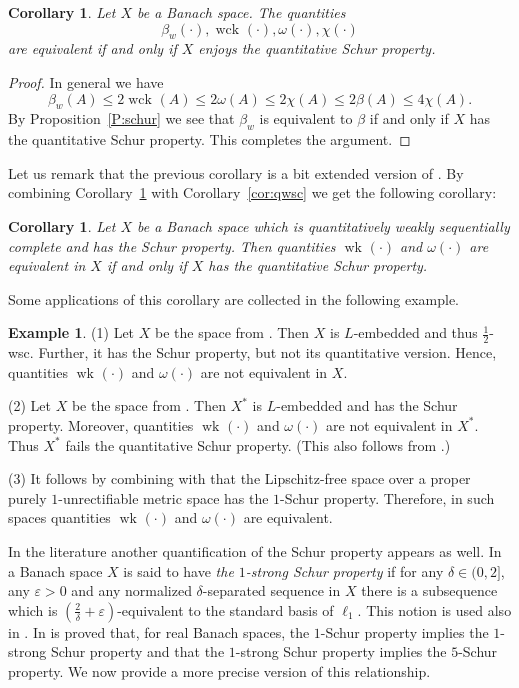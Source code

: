 \documentclass{amsart}
\numberwithin{equation}{section}
\newtheorem{cor}[thm]{Corollary}
\theoremstyle{definition}
\newtheorem{example2}[thm]{Example}
\newcommand{\wk}[2][]{\operatorname{wk}_{#1}\left(#2\right)}
\newcommand{\wck}[2][]{\operatorname{wck}_{#1}\left(#2\right)}
\begin{document}
\begin{cor}\label{cor:qschur}
    Let $X$ be a Banach space. The quantities
    $$\beta_w(\cdot),\wck{\cdot},\omega(\cdot),\chi(\cdot)$$
    are equivalent if and only if $X$ enjoys the quantitative Schur property.
\end{cor}

\begin{proof}
    In general we have
    $$\beta_w(A)\le 2\wck{A}\le2\omega(A)\le2\chi(A)\le2\beta(A)\le 4\chi(A).$$
    By Proposition~\ref{P:schur} we see that $\beta_w$ is equivalent to $\beta$ if and only if $X$ has the quantitative Schur property. This completes the argument.
\end{proof}

Let us remark that the previous corollary is a bit extended version of \cite[Theorem 2.1(ii)]{qschur-dp}.
By combining Corollary~\ref{cor:qschur} with Corollary~\ref{cor:qwsc} we get the following corollary:

\begin{cor}
   Let $X$ be a Banach space which is quantitatively weakly sequentially complete and has the Schur property. Then quantities $\wk{\cdot}$ and $\omega(\cdot)$ are equivalent in $X$ if and only if $X$ has the quantitative Schur property. 
\end{cor}

Some applications of this corollary are collected in the following example.

\begin{example2}
(1) Let $X$ be the space from \cite[Example 1.4]{qschur}. Then $X$ is $L$-embedded and thus $\frac12$-wsc. Further, it has the Schur property, but not its quantitative version. Hence, quantities $\wk{\cdot}$ and $\omega(\cdot)$ are not equivalent in $X$.

(2) Let $X$ be the space from  \cite[Example 10.1]{qdpp}. Then $X^*$ is $L$-embedded and has the Schur property. Moreover, quantities $\wk{\cdot}$ and $\omega(\cdot)$ are not equivalent in $X^*$. Thus $X^*$ fails the quantitative Schur property. (This also follows from \cite[Theorem 2.1]{qschur-dp}.)
 
(3) It follows by combining \cite[Proposition 17]{petitjean-schur} with \cite[Theorem 3.2]{p1u} that the Lipschitz-free space over a proper purely $1$-unrectifiable metric space has the $1$-Schur property. Therefore, in such spaces quantities $\wk{\cdot}$ and $\omega(\cdot)$ are equivalent.
\end{example2}


In the literature another quantification of the Schur property appears as well.  In \cite[p. 57]{Go-Ka-Li} a Banach space $X$ is said to have \emph{the $1$-strong Schur property} if for any $\delta\in(0,2]$, any $\varepsilon>0$ and any normalized $\delta$-separated sequence in $X$ there is a subsequence which is $(\frac2\delta+\varepsilon)$-equivalent to the standard basis of $\ell_1$. This notion is used also in \cite{p1u}. In \cite[Proposition 4.1]{qschur} is proved that, for real Banach spaces, the $1$-Schur property implies the $1$-strong Schur property and that the $1$-strong Schur property implies the $5$-Schur property. We now provide a more precise version of this relationship.
\end{document}
